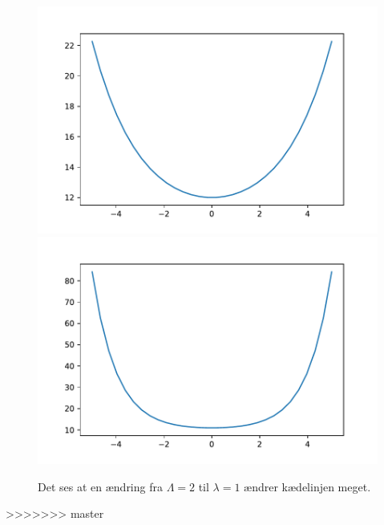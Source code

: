 \begin{figure}[h!]
\includegraphics[scale=0.5]{code/fig3}
\includegraphics[scale=0.5]{code/fig4}
\caption{Det ses at en ændring fra $\Lambda=2$ til $\lambda=1$ ændrer kædelinjen meget.}
\end{figure}

>>>>>>> master

